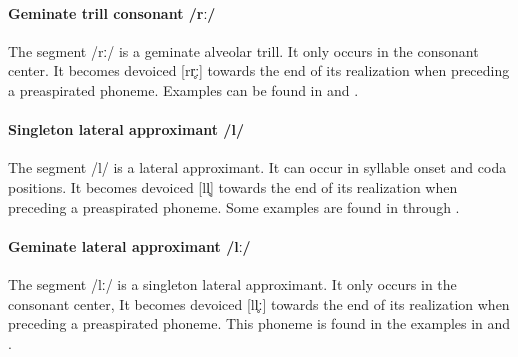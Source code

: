 \paragraph{Geminate trill consonant /rː/}
The segment /rː/ is a geminate alveolar trill. It only occurs in the consonant center. 
It becomes devoiced [rr̥ː] towards the end of its realization when preceding a preaspirated phoneme. 
Examples can be found in  and . 


\paragraph{Singleton lateral approximant /l/}
The segment /l/ is a lateral approximant. It can occur in syllable onset and coda positions. 
It becomes devoiced [ll̥] towards the end of its realization when preceding a preaspirated phoneme. 
Some examples are found in  through . 

\paragraph{Geminate lateral approximant /lː/}
The segment /lː/ is a singleton lateral approximant. It only occurs in the consonant center, 
It becomes devoiced [ll̥ː] towards the end of its realization when preceding a preaspirated phoneme. 
This phoneme is found in the examples in  and .


